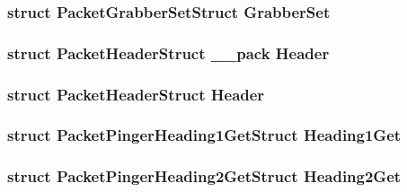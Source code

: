 \subsubsection[{Grabber\+Set}]{\setlength{\rightskip}{0pt plus 5cm}struct {\bf Packet\+Grabber\+Set\+Struct} Grabber\+Set}\label{union_packet_union_a0597efad3340cd6aad7e20f88fb64e38}
\hypertarget{union_packet_union_acbbd8a011a1defa601de078f4c4bab97}{}
\subsubsection[{Header}]{\setlength{\rightskip}{0pt plus 5cm}struct {\bf Packet\+Header\+Struct} \+\_\+\+\_\+pack Header}\label{union_packet_union_acbbd8a011a1defa601de078f4c4bab97}
\hypertarget{union_packet_union_ab201af50281aff5ed4f984f994938007}{}
\subsubsection[{Header}]{\setlength{\rightskip}{0pt plus 5cm}struct {\bf Packet\+Header\+Struct} Header}\label{union_packet_union_ab201af50281aff5ed4f984f994938007}
\hypertarget{union_packet_union_a466137506a1af4d846a3906eea631d18}{}
\subsubsection[{Heading1\+Get}]{\setlength{\rightskip}{0pt plus 5cm}struct {\bf Packet\+Pinger\+Heading1\+Get\+Struct} Heading1\+Get}\label{union_packet_union_a466137506a1af4d846a3906eea631d18}
\hypertarget{union_packet_union_a595ca3a8c11316dd556c857bbcc090ff}{}
\subsubsection[{Heading2\+Get}]{\setlength{\rightskip}{0pt plus 5cm}struct {\bf Packet\+Pinger\+Heading2\+Get\+Struct} Heading2\+Get}\label{union_packet_union_a595ca3a8c11316dd556c857bbcc090ff}
\hypertarget{union_packet_union_a4d04f6e9b20e542b2d759220c2a8dc2e}{}
